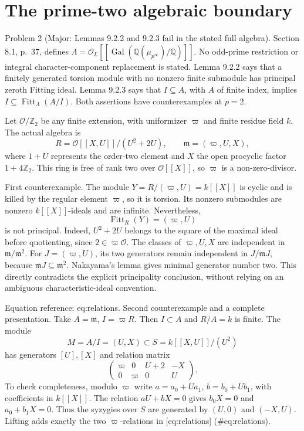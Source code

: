 \documentclass[10pt]{article}
\begin{document}
\section*{The prime-two algebraic boundary}
Problem 2 (Major: Lemmas 9.2.2 and 9.2.3 fail in the stated full algebra).  Section 8.1, p. 37, defines \(\Lambda=\mathcal O_L[[\operatorname{Gal}(\mathbb Q(\mu_{p^\infty})/\mathbb Q)]]\). No odd-prime restriction or integral character-component replacement is stated. Lemma 9.2.2 says that a finitely generated torsion module with no nonzero finite submodule has principal zeroth Fitting ideal. Lemma 9.2.3 says that \(I\subseteq A\), with \(A\) of finite index, implies \(I\subseteq\operatorname{Fitt}_\Lambda(A/I)\). Both assertions have counterexamples at \(p=2\).\par
Let \(\mathcal O/\mathbb Z_2\) be any finite extension, with uniformizer \(\varpi\) and finite residue field \(k\). The actual algebra is \[R=\mathcal O[[X,U]]/(U^2+2U),\qquad
 \mathfrak m=(\varpi,U,X),\] where \(1+U\) represents the order-two element and \(X\) the open procyclic factor \(1+4\mathbb Z_2\). This ring is free of rank two over \(\mathcal O[[X]]\), so \(\varpi\) is a non-zero-divisor.\par
First counterexample. The module \(Y=R/(\varpi,U)=k[[X]]\) is cyclic and is killed by the regular element \(\varpi\), so it is torsion. Its nonzero submodules are nonzero \(k[[X]]\)-ideals and are infinite. Nevertheless, \[\operatorname{Fitt}_R(Y)=(\varpi,U)\] is not principal. Indeed, \(U^2+2U\) belongs to the square of the maximal ideal before quotienting, since \(2\in\varpi\mathcal O\). The classes of \(\varpi,U,X\) are independent in \(\mathfrak m/\mathfrak m^2\). For \(J=(\varpi,U)\), its two generators remain independent in \(J/\mathfrak mJ\), because \(\mathfrak mJ\subseteq\mathfrak m^2\). Nakayama’s lemma gives minimal generator number two. This directly contradicts the explicit principality conclusion, without relying on an ambiguous characteristic-ideal convention.\par
Equation reference: eq:relations. Second counterexample and a complete presentation. Take \(A=\mathfrak m\), \(I=\varpi R\). Then \(I\subset A\) and \(R/A=k\) is finite. The module \[M=A/I=(U,X)\subset
 S=k[[X,U]]/(U^2)\] has generators \([U],[X]\) and relation matrix \[\begin{pmatrix}
 \varpi&0&U+2&-X\\
 0&\varpi&0&U
 \end{pmatrix}.
 \] To check completeness, modulo \(\varpi\) write \(a=a_0+Ua_1\), \(b=b_0+Ub_1\), with coefficients in \(k[[X]]\). The relation \(aU+bX=0\) gives \(b_0X=0\) and \(a_0+b_1X=0\). Thus the syzygies over \(S\) are generated by \((U,0)\) and \((-X,U)\). Lifting adds exactly the two \(\varpi\)-relations in [eq:relations] (\#eq:relations).\par
\end{document}
